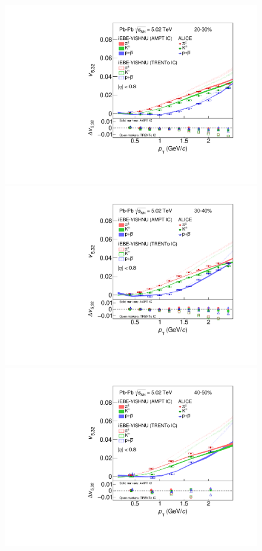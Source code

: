 \begin{figure}[!htb]
\begin{center}
\includegraphics[scale=0.26]{figures/model/TrentoAndAMPT_v523_gap00_new_20-30_PID2.pdf}
\includegraphics[scale=0.26]{figures/model/TrentoAndAMPT_v523_gap00_new_30-40_PID2.pdf}
\includegraphics[scale=0.26]{figures/model/TrentoAndAMPT_v523_gap00_new_40-50_PID2.pdf}

\end{center}
\end{figure}
